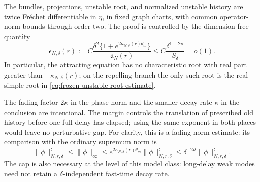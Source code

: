 \begin{proposition}
The bundles, projections, unstable root, and normalized unstable history are
twice Fr\'{e}chet differentiable in \(\eta\), in fixed graph charts, with
common operator-norm bounds through order two.  The proof is controlled by
the dimension-free quantity
\begin{equation}
 \epsilon_{N,\delta}(r)
 :=C\frac{\delta^2
       \{1+e^{2\kappa_{N,\delta}(r)\theta_m}\}}
          {\mathfrak a_N(r)}
 \le C\frac{\delta^{1-2\vartheta}}{S_\delta}=o(1).  \label{eq:frozen-history-smallness}
\end{equation}
In particular, the attracting equation has no characteristic root with
real part greater than \(-\kappa_{N,\delta}(r)\); on the repelling branch the
only such root is the real simple root in
\cref{eq:frozen-unstable-root-estimate}.
\end{proposition}

The fading factor \(2\kappa\) in the phase norm and the smaller decay rate
\(\kappa\) in the conclusion are intentional.  The margin controls the
translation of prescribed old history before one full delay has elapsed;
using the same exponent in both places would leave no perturbative gap.
For clarity, this is a fading-norm estimate: its comparison with the ordinary
supremum norm is
\begin{equation}
 \|\phi\|^\sharp_{N,r,\delta}\le\|\phi\|_\infty
 \le e^{2\kappa_{N,\delta}(r)\theta_m}
       \|\phi\|^\sharp_{N,r,\delta}
 \le\delta^{-2\vartheta}\|\phi\|^\sharp_{N,r,\delta}.         \label{eq:frozen-history-norm-equivalence}
\end{equation}
The cap is also necessary at the level of this model class: long-delay weak
modes need not retain a \(\delta\)-independent fast-time decay rate.

